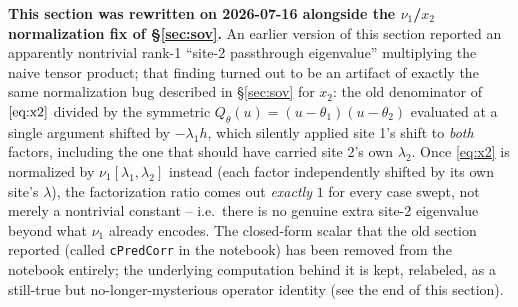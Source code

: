 \documentclass[11pt]{article}
\newcommand{\qth}{Q_\theta}
\begin{document}
\textbf{This section was rewritten on 2026-07-16 alongside the $\nu_1$/$x_2$ normalization fix of
\S\ref{sec:sov}.} An earlier version of this section reported an apparently nontrivial rank-1
``site-2 passthrough eigenvalue'' multiplying the naive tensor product; that finding turned out to
be an artifact of exactly the same normalization bug described in \S\ref{sec:sov} for $x_2$: the
old denominator of $\eqref{eq:x2}$ divided by the symmetric $\qth(u)=(u-\theta_1)(u-\theta_2)$
evaluated at a single argument shifted by $-\lambda_1 h$, which silently applied site 1's shift to
\emph{both} factors, including the one that should have carried site 2's own $\lambda_2$. Once
\eqref{eq:x2} is normalized by $\nu_1[\lambda_1,\lambda_2]$ instead (each factor independently
shifted by its own site's $\lambda$), the factorization ratio comes out \emph{exactly} $1$ for
every case swept, not merely a nontrivial constant -- i.e.\ there is no genuine extra site-2
eigenvalue beyond what $\nu_1$ already encodes. The closed-form scalar that the old section reported
(called \texttt{cPredCorr} in the notebook) has been removed from the notebook entirely; the
underlying computation behind it is kept, relabeled, as a still-true but no-longer-mysterious
operator identity (see the end of this section).
\end{document}
